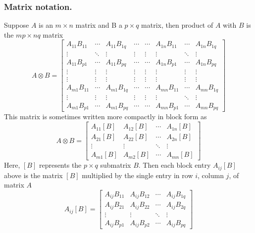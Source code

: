 \documentclass[../../../main.tex]{subfiles}
\begin{document}
\subsubsection{Matrix notation.}
Suppose $A$ is an $m \times n$ matrix and B a $p \times q$ matrix, then product of $A$ with $B$ is the $mp \times nq$ matrix
\begin{equation*}
  A\otimes B =
  \begin{bmatrix}
    A_{11}B_{11} & \cdots & A_{11}B_{1q} & \cdots & \cdots & A_{1n}B_{11} & \cdots & A_{1n}B_{1q} \\
    \vdots       & \ddots & \vdots       & \vdots & \vdots & \vdots       & \ddots & \vdots       \\
    A_{11}B_{p1} & \cdots & A_{11}B_{pq} & \cdots & \cdots & A_{1n}B_{p1} & \cdots & A_{1n}B_{pq} \\
    \vdots       & \vdots & \vdots       & \vdots & \vdots & \vdots       & \vdots & \vdots       \\
    \vdots       & \vdots & \vdots       & \vdots & \vdots & \vdots       & \vdots & \vdots       \\
    A_{m1}B_{11} & \cdots & A_{m1}B_{1q} & \cdots & \cdots & A_{mn}B_{11} & \cdots & A_{mn}B_{1q} \\
    \vdots       & \vdots & \vdots       & \vdots & \vdots & \vdots       & \ddots & \vdots       \\
    A_{m1}B_{p1} & \cdots & A_{m1}B_{pq} & \cdots & \cdots & A_{mn}B_{p1} & \cdots & A_{mn}B_{pq}
  \end{bmatrix}
\end{equation*}
This matrix is sometimes written more compactly in block form as
\begin{equation*}
  A \otimes B =
  \begin{bmatrix}
    A_{11}[B] & A_{12}[B] & \cdots & A_{1n}[B] \\
    A_{21}[B] & A_{22}[B] & \cdots & A_{2n}[B] \\
    \vdots    & \vdots    & \ddots & \vdots    \\
    A_{m1}[B] & A_{m2}[B] & \cdots & A_{mn}[B]
  \end{bmatrix}
\end{equation*}
Here, $[B]$ represents the $p \times q$ submatrix $B$.
Then each block entry $A_{ij}[B]$ above is the matrix $[B]$ multiplied by the single entry in row $i$, column $j$, of matrix $A$
\begin{equation*}
  A_{ij}[B] =
  \begin{bmatrix}
    A_{ij}B_{11} & A_{ij}B_{12} & \cdots & A_{ij}B_{1q} \\
    A_{ij}B_{21} & A_{ij}B_{22} & \cdots & A_{ij}B_{2q} \\
    \vdots       & \vdots       & \ddots & \vdots       \\
    A_{ij}B_{p1} & A_{ij}B_{p2} & \cdots & A_{ij}B_{pq}
  \end{bmatrix}
\end{equation*}
\end{document}
